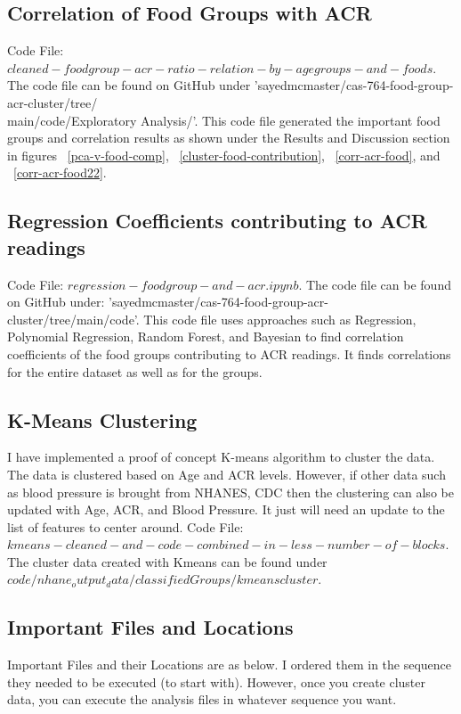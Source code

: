 \subsection{Correlation of Food Groups with ACR}
\flushleft \justifying Code File: $cleaned-foodgroup-acr-ratio-relation-by-agegroups-and-foods$. The code file can be found on GitHub under 'sayedmcmaster/cas-764-food-group-acr-cluster/tree/ \\ main/code/Exploratory Analysis/'. This code file generated the important food groups and correlation results as shown under the Results and Discussion section in figures ~\ref{pca-v-food-comp}, ~\ref{cluster-food-contribution}, ~\ref{corr-acr-food}, and ~\ref{corr-acr-food22}.

\subsection{Regression Coefficients contributing to ACR readings}
\flushleft \justifying Code File: $regression-foodgroup-and-acr.ipynb$. The code file can be found on GitHub under: 'sayedmcmaster/cas-764-food-group-acr-cluster/tree/main/code'. This code file uses approaches such as Regression, Polynomial Regression, Random Forest, and Bayesian to find correlation coefficients of the food groups contributing to ACR readings. It finds correlations for the entire dataset as well as for the groups.

\subsection{K-Means Clustering}
\flushleft \justifying I have implemented a proof of concept K-means algorithm to cluster the data. The data is clustered based on Age and ACR levels. However, if other data such as blood pressure is brought from NHANES, CDC then the clustering can also be updated with Age, ACR, and Blood Pressure. It just will need an update to the list of features to center around.
Code File: $kmeans-cleaned-and-code-combined-in-less-number-of-blocks$. The cluster data created with Kmeans can be found under $code/nhane_output_data/classifiedGroups/kmeanscluster$.

\subsection{Important Files and Locations}
\flushleft \justifying Important Files and their Locations are as below. I ordered them in the sequence they needed to be executed (to start with). However, once you create cluster data, you can execute the analysis files in whatever sequence you want.

